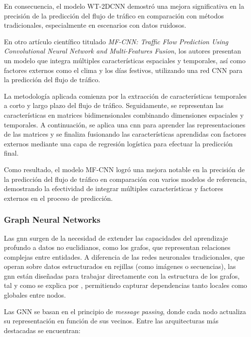En consecuencia, el modelo WT-2DCNN demostró una mejora significativa en la precisión de la predicción del flujo de tráfico en comparación con métodos tradicionales, especialmente en escenarios con datos ruidosos.

En otro artículo científico titulado \textit{MF-CNN: Traffic Flow Prediction Using Convolutional Neural Network and Multi-Features Fusion}, los autores \cite{forecastMfCnn} presentan un modelo que integra múltiples características espaciales y temporales, así como factores externos como el clima y los días festivos, utilizando una red CNN para la predicción del flujo de tráfico.​

La metodología aplicada comienza por la extracción de características temporales a corto y largo plazo del flujo de tráfico. Seguidamente, se representan las características en matrices bidimensionales combinando dimensiones espaciales y temporales. A continuación, se aplica una \acrshort{cnn} para aprender las representaciones de las matrices y se finaliza fusionando las características aprendidas con factores externos mediante una capa de regresión logística para efectuar la predicción final.

Como resultado, el modelo MF-CNN logró una mejora notable en la precisión de la predicción del flujo de tráfico en comparación con varios modelos de referencia, demostrando la efectividad de integrar múltiples características y factores externos en el proceso de predicción.​

\subsubsection{Graph Neural Networks}

Las \acrlong{gnn} surgen de la necesidad de extender las capacidades del aprendizaje profundo a datos no euclidianos, como los grafos, que representan relaciones complejas entre entidades. A diferencia de las redes neuronales tradicionales, que operan sobre datos estructurados en rejillas (como imágenes o secuencias), las \acrshort{gnn} están diseñadas para trabajar directamente con la estructura de los grafos, tal y como se explica por \cite{theoryGnn}, permitiendo capturar dependencias tanto locales como globales entre nodos.

Las GNN se basan en el principio de \textit{message passing}, donde cada nodo actualiza su representación en función de sus vecinos. Entre las arquitecturas más destacadas se encuentran:​

